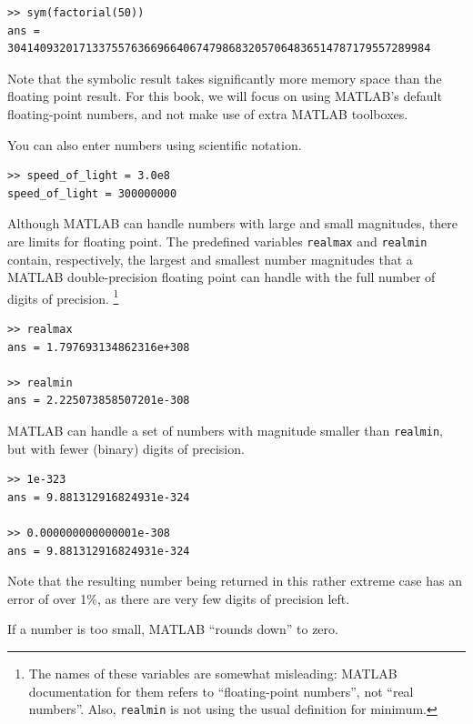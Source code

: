 \documentclass[
]{book}
\begin{document}
\begin{verbatim}
>> sym(factorial(50))
ans = 30414093201713375576366966406747986832057064836514787179557289984
\end{verbatim}

Note that the symbolic result takes significantly more memory space 
than the floating point result.
For this book, we will focus on using MATLAB's default floating-point 
numbers, and not make use of extra MATLAB toolboxes.

You can also enter numbers using scientific notation.

\begin{verbatim}
>> speed_of_light = 3.0e8
speed_of_light = 300000000
\end{verbatim}

Although MATLAB can handle numbers with large and small magnitudes, 
there are limits for floating point.  The
predefined variables {\tt realmax} and {\tt realmin}
 contain, respectively, the
largest and smallest number magnitudes that a MATLAB double-precision 
floating point can handle with the full number of digits of precision.
\footnote{The names of these variables are somewhat misleading: MATLAB
documentation for them refers to ``floating-point numbers'', not ``real
numbers''.  Also, {\tt realmin} is not using the usual definition 
for minimum.}

\begin{verbatim}
>> realmax
ans = 1.797693134862316e+308

>> realmin
ans = 2.225073858507201e-308
\end{verbatim}

MATLAB can handle a set of numbers with magnitude smaller than 
{\tt realmin}, but with fewer (binary) digits of precision.

\begin{verbatim}
>> 1e-323
ans = 9.881312916824931e-324

>> 0.000000000000001e-308
ans = 9.881312916824931e-324
\end{verbatim}

Note that the resulting number being returned in this rather extreme 
case has an error of over 1\%, as there are very few digits of 
precision left.  

If a number is too small, MATLAB ``rounds down'' to zero.
\end{document}
